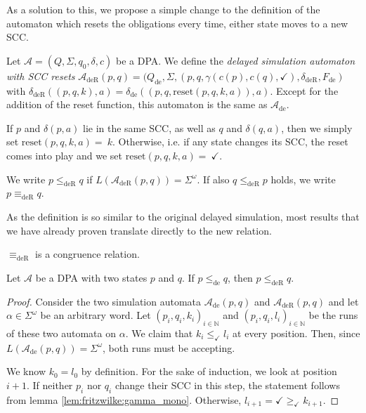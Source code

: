 As a solution to this, we propose a simple change to the definition of the automaton which resets the obligations every time, either state moves to a new SCC. 

\begin{defn}
	Let $\mathcal{A} = (Q, \Sigma, q_0, \delta, c)$ be a DPA. We define the \emph{delayed simulation automaton with SCC resets} $\mathcal{A}_\text{deR}(p, q) = (Q_\text{de}, \Sigma, (p, q, \gamma(c(p), c(q), \checkmark), \delta_\text{deR}, F_\text{de})$ with $\delta_\text{deR}((p, q, k), a) = \delta_\text{de}((p, q, \text{reset}(p, q, k, a)), a)$. Except for the addition of the reset function, this automaton is the same as $\mathcal{A}_\text{de}$.
	
	If $p$ and $\delta(p, a)$ lie in the same SCC, as well as $q$ and $\delta(q, a)$, then we simply set $\text{reset}(p, q, k, a) =~k$. Otherwise, i.e. if any state changes its SCC, the reset comes into play and we set $\text{reset}(p, q, k, a) =~\checkmark$.
	
	We write $p \leq_\text{deR} q$ if $L(\mathcal{A}_\text{deR}(p, q)) = \Sigma^\omega$. If also $q \leq_\text{deR} p$ holds, we write $p \equiv_\text{deR} q$.
\end{defn}

As the definition is so similar to the original delayed simulation, most results that we have already proven translate directly to the new relation. 

\begin{theorem}
	$\equiv_\text{deR}$ is a congruence relation.
\end{theorem}

\begin{lem}
	Let $\mathcal{A}$ be a DPA with two states $p$ and $q$. If $p \leq_\text{de} q$, then $p \leq_\text{deR} q$.
\end{lem}

\begin{proof}
	Consider the two simulation automata $\mathcal{A}_\text{de}(p, q)$ and $\mathcal{A}_\text{deR}(p, q)$ and let $\alpha \in \Sigma^\omega$ be an arbitrary word. Let $(p_i, q_i, k_i)_{i \in \mathbb{N}}$ and $(p_i, q_i, l_i)_{i \in \mathbb{N}}$ be the runs of these two automata on $\alpha$. We claim that $k_i \leq_\checkmark l_i$ at every position. Then, since $L(\mathcal{A}_\text{de}(p, q)) = \Sigma^\omega$, both runs must be accepting.
	
	We know $k_0 = l_0$ by definition. For the sake of induction, we look at position $i+1$. If neither $p_i$ nor $q_i$ change their SCC in this step, the statement follows from lemma \ref{lem:fritzwilke:gamma_mono}. Otherwise, $l_{i+1} = \checkmark \geq_\checkmark k_{i+1}$.
\end{proof}

